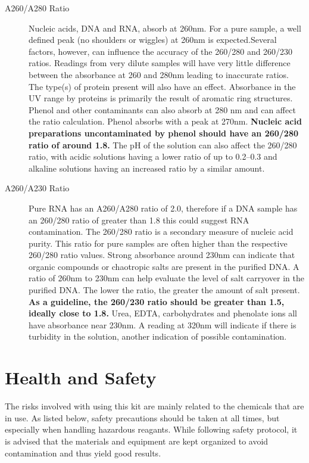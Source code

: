 \documentclass[12pt]{../SOP3_alpha}\usepackage[]{graphicx}\usepackage[]{color}
\begin{document}
\begin{description}
  \item[A260/A280 Ratio] Nucleic acids, DNA and RNA, absorb at 260nm. For a pure sample, a well defined peak (no shoulders or wiggles) at 260nm is expected.Several factors, however, can influence the accuracy of the 260/280 and 260/230 ratios. Readings from very dilute samples will have very little difference between the absorbance at 260 and 280nm leading to inaccurate ratios.  The type(s) of protein present will also have an effect.  Absorbance in the UV range by proteins is primarily the result of aromatic ring structures. Phenol and other contaminants can also absorb at 280 nm and can affect the ratio calculation. Phenol absorbs with a peak at 270nm. \textbf{Nucleic acid preparations uncontaminated by phenol should have an 260/280 ratio of around 1.8. } The pH of the solution can also affect the 260/280 ratio, with acidic solutions having a lower ratio of up to 0.2–0.3 and alkaline solutions having an increased ratio by a similar amount.
  \item[A260/A230 Ratio] Pure RNA has an A260/A280 ratio of 2.0, therefore if a DNA sample has an 260/280 ratio of greater than 1.8 this could suggest RNA contamination. The 260/280 ratio is a secondary measure of nucleic acid purity. This ratio for pure samples are often higher than the respective 260/280 ratio values. Strong absorbance around 230nm can indicate that organic compounds or chaotropic salts are present in the purified DNA.  A ratio of 260nm to 230nm can help evaluate the level of salt carryover in the purified DNA. The lower the ratio, the greater the amount of salt present. \textbf{As a guideline, the 260/230 ratio should be greater than 1.5, ideally close to 1.8.} Urea, EDTA, carbohydrates and phenolate ions all have absorbance near 230nm. A reading at 320nm will indicate if there is turbidity in the solution, another indication of possible contamination.  

\end{description}

\section{Health and Safety}

\NP The risks involved with using this kit are mainly related to the chemicals that are in use. As listed below, safety precautions should be taken at all times, but especially when handling hazardous reagants. While following safety protocol, it is advised that the materials and equipment are kept organized to avoid contamination and thus yield good results. 
\end{document}
